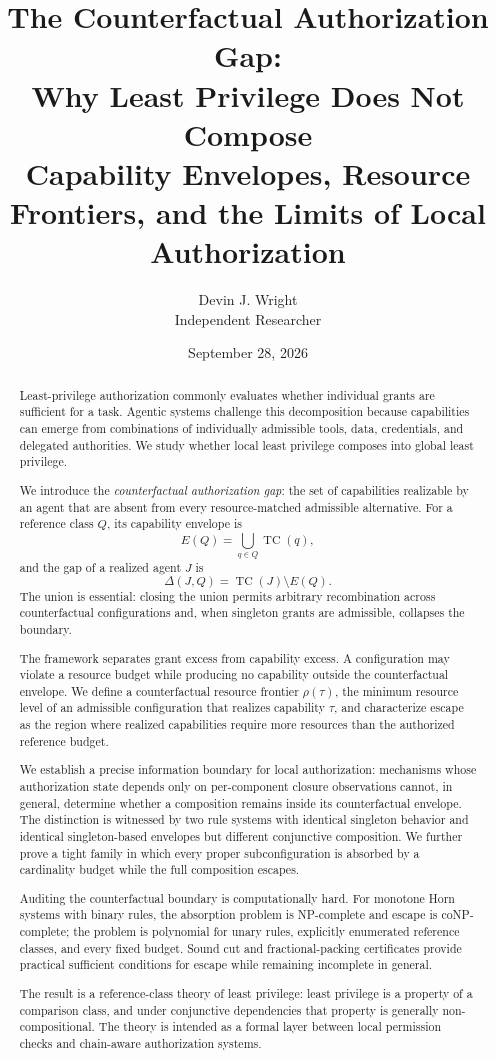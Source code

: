 \documentclass[11pt]{article}
\title{\textbf{The Counterfactual Authorization Gap:}\\
Why Least Privilege Does Not Compose\\[4pt]
\large Capability Envelopes, Resource Frontiers, and the Limits of Local Authorization}
\author{Devin J. Wright\\Independent Researcher}
\date{September 28, 2026}
\newcommand{\TC}{\operatorname{TC}}
\begin{document}
\maketitle

\begin{abstract}
Least-privilege authorization commonly evaluates whether individual grants are sufficient for a task. Agentic systems challenge this decomposition because capabilities can emerge from combinations of individually admissible tools, data, credentials, and delegated authorities. We study whether local least privilege composes into global least privilege.

We introduce the \emph{counterfactual authorization gap}: the set of capabilities realizable by an agent that are absent from every resource-matched admissible alternative. For a reference class $Q$, its capability envelope is
\[
E(Q)=\bigcup_{q\in Q}\TC(q),
\]
and the gap of a realized agent $J$ is
\[
\Delta(J,Q)=\TC(J)\setminus E(Q).
\]
The union is essential: closing the union permits arbitrary recombination across counterfactual configurations and, when singleton grants are admissible, collapses the boundary.

The framework separates grant excess from capability excess. A configuration may violate a resource budget while producing no capability outside the counterfactual envelope. We define a counterfactual resource frontier $\rho(\tau)$, the minimum resource level of an admissible configuration that realizes capability $\tau$, and characterize escape as the region where realized capabilities require more resources than the authorized reference budget.

We establish a precise information boundary for local authorization: mechanisms whose authorization state depends only on per-component closure observations cannot, in general, determine whether a composition remains inside its counterfactual envelope. The distinction is witnessed by two rule systems with identical singleton behavior and identical singleton-based envelopes but different conjunctive composition. We further prove a tight family in which every proper subconfiguration is absorbed by a cardinality budget while the full composition escapes.

Auditing the counterfactual boundary is computationally hard. For monotone Horn systems with binary rules, the absorption problem is NP-complete and escape is coNP-complete; the problem is polynomial for unary rules, explicitly enumerated reference classes, and every fixed budget. Sound cut and fractional-packing certificates provide practical sufficient conditions for escape while remaining incomplete in general.

The result is a reference-class theory of least privilege: least privilege is a property of a comparison class, and under conjunctive dependencies that property is generally non-compositional. The theory is intended as a formal layer between local permission checks and chain-aware authorization systems.
\end{abstract}
\end{document}

